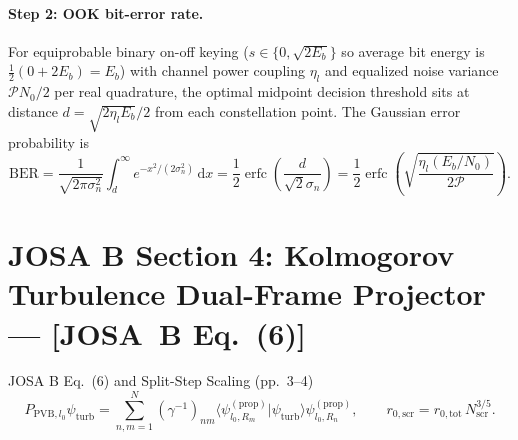 \documentclass[10pt,letterpaper]{article}
\newcommand{\braket}[2]{\langle #1 | #2 \rangle}
\newcommand{\dd}{\mathrm{d}}
\newcommand{\josb}[1]{\textbf{[JOSA~B Eq.~(#1)]}}
\numberwithin{equation}{section}
\begin{document}
\paragraph*{Step 2: OOK bit-error rate.}
For equiprobable binary on-off keying ($s \in \{0, \sqrt{2E_b}\}$ so average bit energy is $\frac{1}{2}(0 + 2E_b) = E_b$) with channel power coupling $\eta_l$ and equalized noise variance $\mathcal{P} N_0/2$ per real quadrature, the optimal midpoint decision threshold sits at distance $d = \sqrt{2\eta_l E_b}/2$ from each constellation point. The Gaussian error probability is
\begin{equation}
  \mathrm{BER} = \frac{1}{\sqrt{2\pi\sigma_n^2}}\int_{d}^\infty e^{-x^2/(2\sigma_n^2)}\,\dd x = \frac{1}{2}\operatorname{erfc}\!\left(\frac{d}{\sqrt{2}\sigma_n}\right) = \frac{1}{2}\operatorname{erfc}\!\left(\sqrt{\frac{\eta_l(E_b/N_0)}{2\mathcal{P}}}\right).
\end{equation}

\section{JOSA B Section 4: Kolmogorov Turbulence Dual-Frame Projector --- \josb{6}}
\label{sec:b4_turb}

\begin{targeteq}{JOSA B Eq.~(6) and Split-Step Scaling (pp.~3--4)}
\[
  P_{\mathrm{PVB},l_0}\psi_{\mathrm{turb}} = \sum_{n,m=1}^N (\gamma^{-1})_{nm}\braket{\psi_{l_0,R_m}^{(\mathrm{prop})}}{\psi_{\mathrm{turb}}}\psi_{l_0,R_n}^{(\mathrm{prop})}, \qquad r_{0,\mathrm{scr}} = r_{0,\mathrm{tot}}\,N_{\mathrm{scr}}^{3/5}.
\]
\end{targeteq}
\end{document}

